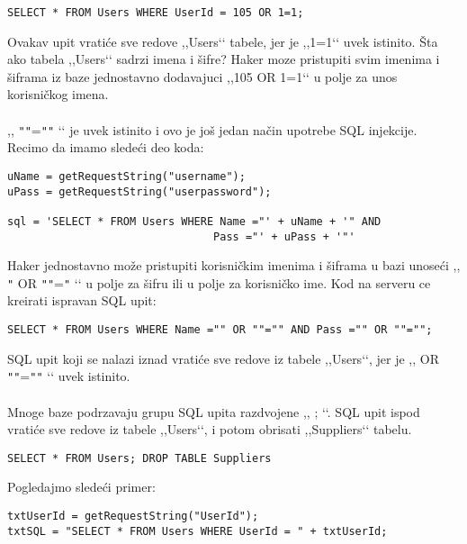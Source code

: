 \documentclass[a4paper]{article}
\begin{document}
\begin{verbatim}
SELECT * FROM Users WHERE UserId = 105 OR 1=1;
\end{verbatim}


\noindent Ovakav upit vratiće sve redove ,,Users‘‘ tabele, jer je ,,1=1‘‘ uvek istinito. Šta ako tabela ,,Users‘‘ sadrzi imena i šifre? Haker moze pristupiti svim imenima i šiframa iz baze jednostavno dodavajuci ,,105 OR 1=1‘‘ u polje za unos korisničkog imena.

\paragraph{}
 ,, \texttt{"}\texttt{"}=\texttt{"}\texttt{"} ‘‘ je uvek istinito i ovo je još jedan način upotrebe SQL injekcije. Recimo da imamo sledeći deo koda:
\begin{verbatim}
uName = getRequestString("username");
uPass = getRequestString("userpassword");

sql = 'SELECT * FROM Users WHERE Name ="' + uName + '" AND 
								Pass ="' + uPass + '"'
\end{verbatim}

\noindent Haker jednostavno može pristupiti korisničkim imenima i šiframa u bazi unoseći ,, \texttt{"} OR \texttt{"}\texttt{"}=\texttt{"} ‘‘ u polje za šifru ili u polje za korisničko ime. Kod na serveru ce kreirati ispravan SQL upit:

\begin{verbatim}
SELECT * FROM Users WHERE Name ="" OR ""="" AND Pass ="" OR ""="";
\end{verbatim}

\noindent SQL upit koji se nalazi iznad vratiće sve redove iz tabele ,,Users‘‘, jer je ,, OR \texttt{"}\texttt{"}=\texttt{"}\texttt{"} ‘‘ uvek istinito. 

\paragraph{}
Mnoge baze podrzavaju grupu SQL upita razdvojene ,, ; ‘‘. SQL upit ispod vratiće sve redove iz tabele ,,Users‘‘, i potom obrisati ,,Suppliers‘‘ tabelu.

\begin{verbatim}
SELECT * FROM Users; DROP TABLE Suppliers
\end{verbatim}

\noindent Pogledajmo sledeći primer:

\begin{verbatim}
txtUserId = getRequestString("UserId");
txtSQL = "SELECT * FROM Users WHERE UserId = " + txtUserId;
\end{verbatim}
\end{document}
